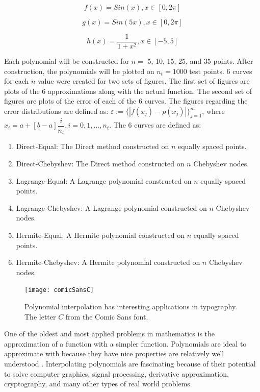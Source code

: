 \documentclass[11pt]{article}%
\begin{document}
\begin{equation}
f\left(x\right) = Sin(x), x \in [0, 2\pi]
\end{equation}

\begin{equation}
g\left(x\right) = Sin(5x), x \in [0, 2\pi]
\end{equation}

\begin{equation}
h\left(x\right) = \dfrac{1}{1+x^2}, x \in [-5, 5]
\end{equation}

Each polynomial will be constructed for $ n = $ 5, 10, 15, 25, and 35 points. After construction, the polynomials will be plotted on $ n_t = 1000 $ test points. 6 curves for each $n$ value were created for two sets of figures. The first set of figures are plots of the 6 approximations along with the actual function. The second set of figures are plots of the error of each of the 6 curves. The figures regarding the error distributions are defined as: $\varepsilon:=\{|f(x_j) - p(x_j)|\}^m_{j=1}$, where $x_i = a + [b - a]\dfrac{i}{n_t}, i = 0, 1, ..., n_t$. The 6 curves are defined as:
\begin{enumerate}
\item Direct-Equal: The Direct method constructed on $n$ equally spaced points.
\item Direct-Chebyshev: The Direct method constructed on $n$ Chebyshev nodes.
\item Lagrange-Equal: A Lagrange polynomial constructed on $n$ equally spaced points.
\item Lagrange-Chebyshev: A Lagrange polynomial constructed on $n$ Chebyshev nodes.
\item Hermite-Equal: A Hermite polynomial constructed on $n$ equally spaced points.
\item Hermite-Chebyshev: A Hermite polynomial constructed on $n$ Chebyshev nodes.
\end{enumerate}

\begin{figure}
\vspace{-21pt} %
\caption{Polynomial interpolation has interesting applications in typography.  The letter $C$ from the Comic Sans font. }\label{wrap-fig:1}
\vspace{10pt} %
\texttt{[image: comicSansC]}


\end{figure} 
One of the oldest and most applied problems in mathematics is the approximation of a function with a simpler function.  Polynomials are ideal to approximate with because they have nice properties are relatively well understood \cite{Epper}.  Interpolating polynomials are fascinating because of their potential to solve computer graphics, signal processing, derivative approximation, cryptography, and many other types of real world problems.
\end{document}
